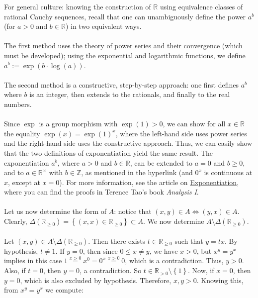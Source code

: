 \begin{solution}
    For general culture: knowing the construction of \( \mathbb{R} \) using equivalence classes of rational Cauchy sequences, recall that one can unambiguously define the power \( a^b \) (for \( a > 0 \) and \( b \in \mathbb{R} \)) in two equivalent ways.
    \\\\
    The first method uses the theory of power series and their convergence (which must be developed); using the exponential and logarithmic functions, we define \( a^b := \exp\left( b \cdot \log\left( a \right) \right) \).
    \\\\
    The second method is a constructive, step-by-step approach: one first defines \( a^b \) where \( b \) is an integer, then extends to the rationals, and finally to the real numbers.
    \\\\
    Since \( \exp \) is a group morphism with \( \exp\left(1\right) > 0 \), we can show for all \( x \in \mathbb{R} \) the equality \( \exp\left( x \right) = \exp\left(1\right)^x \), where the left-hand side uses power series and the right-hand side uses the constructive approach. Thus, we can easily show that the two definitions of exponentiation yield the same result. The exponentiation \( a^b \), where \( a > 0 \) and \( b \in \mathbb{R} \), can be extended to \( a = 0 \) and \( b \geq 0 \), and to \( a \in \mathbb{R}^{\times} \) with \( b \in \mathbb{Z} \), as mentioned in the hyperlink (and \( 0^x \) is continuous at \( x \), except at \( x = 0 \)). For more information, see the article on \href{https://en.wikipedia.org/wiki/Exponentiation}{Exponentiation}, where you can find the proofs in Terence Tao's book \textit{Analysis I}.
    \\\\
    Let us now determine the form of \( A \): notice that \( \left(x,y\right) \in A \Leftrightarrow \left(y,x\right) \in A \). Clearly, \( \Delta\left( \mathbb{R}_{\geq 0} \right) = \left\{ \left( x,x \right) \in \mathbb{R}_{\geq 0} \right\} \subset A \). We now determine \( A \setminus \Delta\left( \mathbb{R}_{\geq 0} \right) \).
    \\\\
    Let \( \left(x,y\right) \in A \setminus \Delta\left( \mathbb{R}_{\geq 0} \right) \). Then there exists \( t \in \mathbb{R}_{\geq 0} \) such that \( y = t x \). By hypothesis, \( t \neq 1 \). If \( y = 0 \), then since \( 0 \leq x \neq y \), we have \( x > 0 \), but \( x^y = y^x \) implies in this case \( 1 \overset{x > 0}{=} x^0 = 0^x \overset{x > 0}{=} 0 \), which is a contradiction. Thus, \( y > 0 \). Also, if \( t = 0 \), then \( y = 0 \), a contradiction. So \( t \in \mathbb{R}_{>0} \setminus \left\{1\right\} \). Now, if \( x = 0 \), then \( y = 0 \), which is also excluded by hypothesis. Therefore, \( x, y > 0 \). Knowing this, from \( x^y = y^x \) we compute:

\end{solution}
